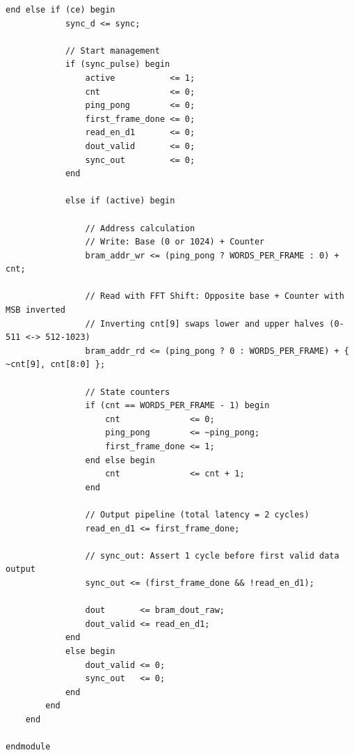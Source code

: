 \begin{lstlisting}[style={prettyverilog}, caption={Verilog code for FFT reorder module.}, label={lst:verilog_fft_reorder}]
        end else if (ce) begin
            sync_d <= sync;

            // Start management
            if (sync_pulse) begin
                active           <= 1;
                cnt              <= 0;
                ping_pong        <= 0;
                first_frame_done <= 0;
                read_en_d1       <= 0;
                dout_valid       <= 0;
                sync_out         <= 0;
            end
            
            else if (active) begin
                
                // Address calculation
                // Write: Base (0 or 1024) + Counter
                bram_addr_wr <= (ping_pong ? WORDS_PER_FRAME : 0) + cnt;

                // Read with FFT Shift: Opposite base + Counter with MSB inverted
                // Inverting cnt[9] swaps lower and upper halves (0-511 <-> 512-1023)
                bram_addr_rd <= (ping_pong ? 0 : WORDS_PER_FRAME) + { ~cnt[9], cnt[8:0] };

                // State counters
                if (cnt == WORDS_PER_FRAME - 1) begin
                    cnt              <= 0;
                    ping_pong        <= ~ping_pong;
                    first_frame_done <= 1;
                end else begin
                    cnt              <= cnt + 1;
                end

                // Output pipeline (total latency = 2 cycles)
                read_en_d1 <= first_frame_done;

                // sync_out: Assert 1 cycle before first valid data output
                sync_out <= (first_frame_done && !read_en_d1);

                dout       <= bram_dout_raw;
                dout_valid <= read_en_d1;
            end 
            else begin
                dout_valid <= 0;
                sync_out   <= 0;
            end
        end
    end

endmodule

\end{lstlisting}

